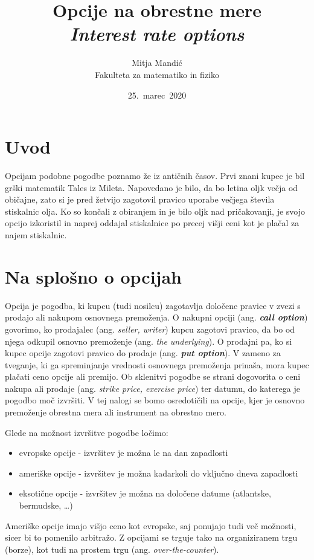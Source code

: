 \documentclass[a4paper]{article}
\title{Opcije na obrestne mere\\
    \textit{Interest rate options}}
\author{Mitja Mandić \\ Fakulteta za matematiko in fiziko}
\date{25.\ marec\ 2020}
\begin{document}
\begin{titlepage}
    \maketitle
    \thispagestyle{empty}
\end{titlepage}

\pagebreak
\tableofcontents
\pagebreak

\section{Uvod}
Opcijam podobne pogodbe poznamo že iz antičnih časov. Prvi znani kupec je bil grški matematik Tales iz Mileta.
Napovedano je bilo, da bo letina oljk večja od običajne, zato si je pred žetvijo zagotovil pravico uporabe večjega
števila stiskalnic olja. Ko so končali z obiranjem in je bilo oljk nad pričakovanji, je svojo opcijo izkoristil in naprej oddajal
stiskalnice po precej višji ceni kot je plačal za najem stiskalnic.

\section{Na splošno o opcijah}

Opcija je pogodba, ki kupcu (tudi nosilcu) zagotavlja določene pravice v zvezi s prodajo ali nakupom osnovnega premoženja.
O nakupni opciji (ang. \textbf{\textit{call option}}) govorimo, ko prodajalec (ang. \textit{seller, writer}) kupcu zagotovi pravico,
da bo od njega odkupil osnovno premoženje (ang. \textit{the underlying}). O prodajni pa, ko si kupec opcije zagotovi 
pravico do prodaje (ang. \textit{\textbf{put option}}).
V zameno za tveganje, ki ga spreminjanje vrednosti osnovnega premoženja prinaša, 
mora kupec plačati ceno opcije ali premijo. Ob sklenitvi pogodbe se strani dogovorita o ceni nakupa ali prodaje
(ang. \textit{strike price, exercise price}) ter datumu, do katerega je pogodbo moč izvršiti.
V tej nalogi se bomo osredotičili na opcije, kjer je osnovno premoženje obrestna mera ali instrument na obrestno mero. 

Glede na možnost izvršitve pogodbe ločimo:
\begin{itemize}
    \item evropske opcije - izvršitev je možna le na dan zapadlosti
    \item ameriške opcije - izvršitev je možna kadarkoli do vključno dneva zapadlosti
    \item eksotične opcije - izvršitev je možna na določene datume (atlantske, bermudske, \ldots)
\end{itemize}
Ameriške opcije imajo višjo ceno kot evropske, saj ponujajo tudi več možnosti, sicer bi to pomenilo arbitražo.
Z opcijami se trguje tako na organiziranem trgu (borze), kot tudi na prostem trgu (ang. \textit{over-the-counter}).
\end{document}
